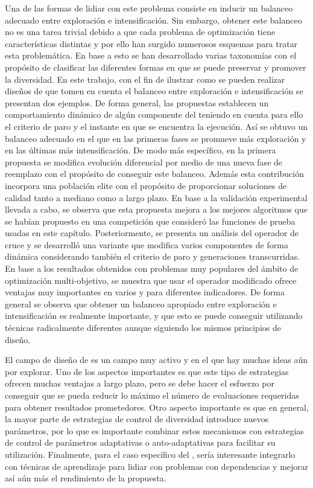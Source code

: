 %
Una de las formas de lidiar con este problema consiste en inducir un balanceo adecuado entre exploración e intensificación.
%
Sin embargo, obtener este balanceo no es una tarea trivial debido a que cada problema de optimización tiene características distintas y por
ello han surgido numerosos esquemas para tratar esta problemática.
%
En base a esto se han desarrollado varias taxonomías con el propósito de clasificar las diferentes formas en que se puede preservar y promover la diversidad.
%
En este trabajo, con el fin de ilustrar como se pueden realizar diseños de \EAS{} que tomen en cuenta el balanceo entre exploración e intensificación
se presentan dos ejemplos.
%
De forma general, las propuestas establecen un comportamiento dinámico de algún componente del \EA{} teniendo en cuenta para ello el criterio de paro 
y el instante en que se encuentra la ejecución.
%
Así se obtuvo un balanceo adecuado en el que en las primeras fases se promueve más exploración y en las últimas más intensificación. 
%
De modo más específico, en la primera propuesta se modifica evolución diferencial por medio de una nueva fase de reemplazo con el propósito de conseguir este balanceo. 
%
Además esta contribución incorpora una población elite con el propósito de proporcionar soluciones de calidad tanto a mediano como a largo plazo.
%
En base a la validación experimental llevada a cabo, se observa que esta propuesta mejora a los mejores algoritmos que se habían propuesto en una competición
que consideró las funciones de prueba usadas en este capítulo.
%
Posteriormente, se presenta un análisis del operador de cruce \SBX{} y se desarrolló una variante que modifica varios componentes de forma dinámica
considerando también el criterio de paro y generaciones transcurridas. 
%
En base a los resultados obtenidos con problemas muy populares del ámbito de optimización multi-objetivo, se muestra que usar el operador \SBX{} modificado ofrece ventajas muy importantes
en varios \MOEAS{} y para diferentes indicadores.
%
De forma general se observa que obtener un balanceo apropiado entre exploración e intensificación es realmente importante, y que
esto se puede conseguir utilizando técnicas radicalmente diferentes aunque siguiendo los mismos principios de diseño.

El campo de diseño de \EAS{} es un campo muy activo y en el que hay muchas ideas aún por explorar.
%
Uno de los aspectos importantes es que este tipo de estrategias ofrecen muchas ventajas a largo plazo, pero se debe hacer el esfuerzo por conseguir
que se pueda reducir lo máximo el número de evaluaciones requeridas para obtener resultados prometedores.
%
Otro aspecto importante es que en general, la mayor parte de estrategias de control de diversidad introduce nuevos parámetros, por lo que es importante
combinar estos mecanismos con estrategias de control de parámetros adaptativas o auto-adaptativas para facilitar su utilización.
%
Finalmente, para el caso específico del \SBX{}, sería interesante integrarlo con técnicas de aprendizaje para lidiar con problemas con dependencias y mejorar
así aún más el rendimiento de la propuesta.
